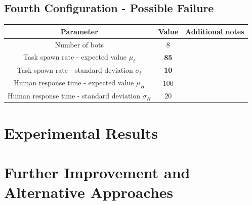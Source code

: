 \documentclass[10pt,a4paper]{article}
\begin{document}
		\subsection{Fourth Configuration - Possible Failure}
			\begin{center}
				\begin{tabular}{ |c|c|c|}
					\hline
					Parameter & Value & Additional notes\\
					\hline
					\hline
					Number of bots & 8 &\\
					\hline
					Task spawn rate - expected value $\mu_t$ & \textbf{85} &\\
					\hline					
					Task spawn rate - standard deviation $\sigma_t$ & \textbf{10} &\\
					\hline
					Human response time - expected value $\mu_H$ & 100 &\\
					\hline					
					Human response time - standard deviation $\sigma_H$ & 20 &\\
					\hline
				\end{tabular}
			\end{center}
	
	\section{Experimental Results}
	
	\section{Further Improvement and Alternative Approaches}
	
	
\end{document}
